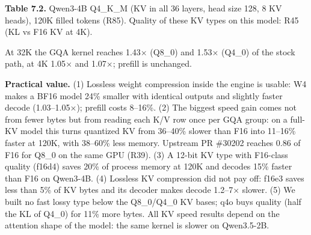 \documentclass[10pt]{article}
\begin{document}
\textbf{Table 7.2.} Qwen3-4B Q4\_K\_M (KV in all 36 layers, head size 128, 8 KV heads), 120K filled tokens (R85). Quality of these KV types on this model: R45 (KL vs F16 KV at 4K).

\begin{table}[h]\centering\scriptsize
{}
\end{table}

At 32K the GQA kernel reaches 1.43$\times$ (Q8\_0) and 1.53$\times$ (Q4\_0) of the stock path, at 4K 1.05$\times$ and 1.07$\times$; prefill
is unchanged.

\textbf{Practical value.} (1) Lossless weight compression inside the engine is usable: W4 makes a BF16 model 24\%
smaller with identical outputs and slightly faster decode (1.03--1.05$\times$); prefill costs 8--16\%. (2) The biggest
speed gain comes not from fewer bytes but from reading each K/V row once per GQA group: on a full-KV model this
turns quantized KV from 36--40\% slower than F16 into 11--16\% faster at 120K, with 38--60\% less memory. Upstream
PR \#30202 reaches 0.86 of F16 for Q8\_0 on the same GPU (R39). (3) A 12-bit KV type with F16-class quality
(f16d4) saves 20\% of process memory at 120K and decodes 15\% faster than F16 on Qwen3-4B. (4) Lossless KV
compression did not pay off: f16e3 saves less than 5\% of KV bytes and its decoder makes decode 1.2--7$\times$ slower.
(5) We built no fast lossy type below the Q8\_0/Q4\_0 KV bases; q4o buys quality (half the KL of Q4\_0) for 11\%
more bytes. All KV speed results depend on the attention shape of the model: the same kernel is slower on
Qwen3.5-2B.
\end{document}
